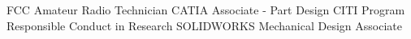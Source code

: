 \documentclass[../Gabriel_Roper_Resume]{subfiles}
\begin{document}

    \Entry FCC Amateur Radio Technician
    \Entry CATIA Associate - Part Design
    \Entry CITI Program Responsible Conduct in Research
    \Entry SOLIDWORKS Mechanical Design Associate
\end{document}
